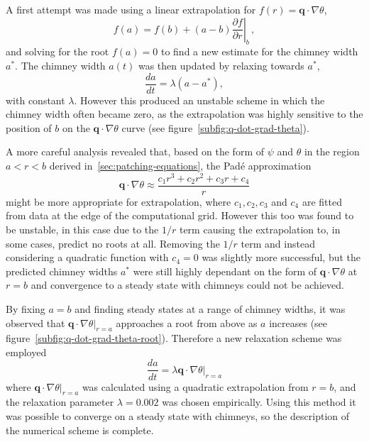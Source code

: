 \documentclass[11pt]{proc}
\begin{document}
A first attempt was made using a linear extrapolation for $f(r) = \mathbf{q} \cdot \nabla \theta$,
\begin{equation}
f(a) = f(b) + (a-b) \left. \frac{\partial f}{\partial r}\right|_b \, ,
\end{equation}
and solving for the root $f(a)=0$ to find a new estimate for the chimney width $a^*$. The chimney width $a(t)$ was then updated by relaxing towards $a^*$,
\begin{equation}
\frac{da}{dt} = \lambda (a - a^*),
\end{equation}
with constant $\lambda$. However this produced an unstable scheme in which the chimney width often became zero, as the extrapolation was highly sensitive to the position of $b$ on the $\mathbf{q} \cdot \nabla \theta$ curve (see figure~\ref{subfig:q-dot-grad-theta}).

A more careful analysis revealed that, based on the form of $\psi$ and $\theta$ in the region $a < r < b$ derived in~\autoref{sec:patching-equations}, the Pad\'{e} approximation
\begin{equation}
\mathbf{q} \cdot \nabla \theta \approx \frac{c_1 r^3 + c_2 r^2 + c_3 r + c_4}{r}
\end{equation}
might be more appropriate for extrapolation, where $c_1, c_2, c_3$ and $c_4$ are fitted from data at the edge of the computational grid. However this too was found to be unstable, in this case due to the $1/r$ term causing the extrapolation to, in some cases, predict no roots at all. Removing the $1/r$ term and instead considering a quadratic function with $c_4=0$ was slightly more successful, but the predicted chimney widths $a^*$ were still highly dependant on the form of $\mathbf{q} \cdot \nabla \theta$ at $r=b$ and convergence to a steady state with chimneys could not be achieved.

By fixing $a=b$ and finding steady states at a range of chimney widths, it was observed that $\left. \mathbf{q} \cdot \nabla \theta \right|_{r=a}$ approaches a root from above as $a$ increases (see figure~\ref{subfig:q-dot-grad-theta-root}). Therefore a new relaxation scheme was employed
\begin{equation}
\label{eq:relaxation-q-dot-grad-theta}
\frac{da}{dt} = \lambda \left. \mathbf{q} \cdot \nabla \theta \right|_{r=a}
\end{equation}
where $\left. \mathbf{q} \cdot \nabla \theta \right|_{r=a}$ was calculated using a quadratic extrapolation from $r=b$, and the relaxation parameter $\lambda = 0.002$ was chosen empirically. Using this method it was possible to converge on a steady state with chimneys, so the description of the numerical scheme is complete.
\end{document}
